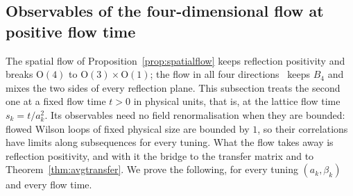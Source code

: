 \subsection{Observables of the four-dimensional flow at positive flow time}
\label{rF13:sec}

The spatial flow of Proposition~\ref{prop:spatialflow} keeps reflection
positivity and breaks $\mathrm O(4)$ to $\mathrm O(3)\times\mathrm O(1)$; the
flow in all four directions~\cite{Lus10} keeps $B_4$ and mixes the two sides
of every reflection plane. This subsection treats the second one at a fixed
flow time $t>0$ in physical units, that is, at the lattice flow time
$s_k=t/a_k^2$. Its observables need no field renormalisation when they are
bounded: flowed Wilson loops of fixed physical size are bounded by $1$, so
their correlations have limits along subsequences for every tuning. What
the flow takes away is reflection positivity, and with it the bridge to the
transfer matrix and to Theorem~\ref{thm:avgtransfer}. We prove the
following, for every tuning $(a_k,\beta_k)$ and every flow time.
